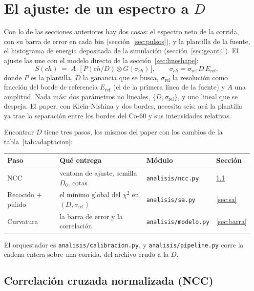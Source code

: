 \documentclass[11pt,a4paper]{article}
\begin{document}
\section{El ajuste: de un espectro a $D$}
\label{sec:ajustecap}
\label{sec:cadena}
\label{sec:ajuste}

Con lo de las secciones anteriores hay dos cosas: el espectro neto de la
corrida, con su barra de error en cada bin (sección~\ref{sec:pulsos}), y la
plantilla de la fuente, el histograma de energía depositada de la simulación
(sección~\ref{sec:geant4}). El ajuste las une con el modelo directo de la
sección~\ref{sec:lineshape}:
\[
   S(ch) \;=\; A \cdot \big[\,P(ch/D) \otimes G(\sigma_{ch})\,\big],
   \qquad \sigma_{ch} = \sigma_{\text{rel}}\,D\,E_{\text{ref}},
\]
donde $P$ es la plantilla, $D$ la ganancia que se busca, $\sigma_{\text{rel}}$
la resolución como fracción del borde de referencia $E_{\text{ref}}$ (el de
la primera línea de la fuente) y $A$ una amplitud. Nada más: dos parámetros
no lineales, $\{D, \sigma_{\text{rel}}\}$, y uno lineal que se despeja. El
paper, con Klein-Nishina y dos bordes, necesita seis; acá la plantilla ya
trae la separación entre los bordes del Co-60 y sus intensidades relativas.

Encontrar $D$ tiene tres pasos, los mismos del paper con los cambios de la
tabla~\ref{tab:adaptacion}:

\begin{center}
\small
\begin{tabular}{@{}llll@{}}
\toprule
\textbf{Paso} & \textbf{Qué entrega} & \textbf{Módulo} & \textbf{Sección} \\
\midrule
NCC & ventana de ajuste, semilla $D_0$, cotas &
   \texttt{analisis/ncc.py} & \ref{sec:ncc} \\
Recocido + pulido & el mínimo global del $\chi^2$ en $(D, \sigma_{\text{rel}})$ &
   \texttt{analisis/sa.py} & \ref{sec:sa} \\
Curvatura & la barra de error y la correlación &
   \texttt{analisis/modelo.py} & \ref{sec:barra} \\
\bottomrule
\end{tabular}
\end{center}

\noindent
El orquestador es \texttt{analisis/calibracion.py}, y
\texttt{analisis/pipeline.py} corre la cadena entera sobre una corrida, del
archivo crudo a la $D$.

\subsection{Correlación cruzada normalizada (NCC)}
\label{sec:ncc}
\adaptado
\end{document}
